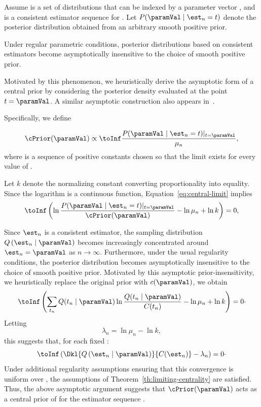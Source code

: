 \newcommand{\estLike}{Q \left( \est_{n} \mid \paramVal \right) }

Assume \setQ is a set of distributions that can be indexed by a parameter vector \param, and \infSeq{\est} is a
consistent estimator sequence for \param.
Let $P(\paramVal \mid\est_n = t)$ denote the posterior distribution obtained from an arbitrary smooth positive
prior.

Under regular parametric conditions, posterior distributions based on consistent estimators become asymptotically
insensitive to the choice of smooth positive prior.

Motivated by this phenomenon, we heuristically derive the asymptotic form of a central prior by considering the
posterior density evaluated at the point $t=\paramVal$.
A similar asymptotic construction also appears in~\cite{BERNARDO200517}.

Specifically, we define

\begin{equation}
    \label{eq:central-limit}
    \cPrior(\paramVal) \propto \toInf \frac{P(\paramVal \mid\est_n = t) \vert_{t = \paramVal}}{\mu_n},
\end{equation}
where \infSeq{\mu} is a sequence of positive constants chosen so that the limit exists for every value of \paramVal.

Let $k$ denote the normalizing constant converting proportionality into equality.
Since the logarithm is a continuous function, Equation~\ref{eq:central-limit} implies
\begin{equation*}
    \toInf \left(\ln \frac{P(\paramVal \mid\est_n = t) \vert_{t = \paramVal}}{\cPrior(\paramVal)}
               - \ln \mu_n + \ln k \right) = 0,
\end{equation*}

Since $\est_n$ is a consistent estimator, the sampling distribution $\estLike$ becomes increasingly concentrated
around $\est_n = \paramVal$ as $n \to \infty$.
Furthermore, under the usual regularity conditions, the posterior distribution becomes asymptotically
insensitive to the choice of smooth positive prior.
Motivated by this asymptotic prior-insensitivity, we heuristically replace the original prior with $c(\paramVal)$,
we obtain
\begin{equation*}
    \toInf \left( \sum_{t_n} Q(t_n \mid \paramVal) \ln
               \frac{Q(t_n \mid \paramVal)}{C(t_n)}
               - \ln \mu_n + \ln k \right) = 0 \cdot
\end{equation*}
Letting
\[
    \lambda_n = \ln \mu_n - \ln k,
\]
this suggests that, for each fixed \paramVal:
\begin{equation*}
    \toInf  \left( \Dkl{\estLike}{C(\est_n)} - \lambda_n \right) = 0 \cdot
\end{equation*}
Under additional regularity assumptions ensuring that this convergence is uniform over \paramVal, the assumptions of
Theorem~\ref{th:limiting-centrality} are satisfied.
Thus, the above asymptotic argument suggests that $\cPrior(\paramVal)$ acts as a central prior of \setQ for the
estimator sequence \infSeq{\est}.

